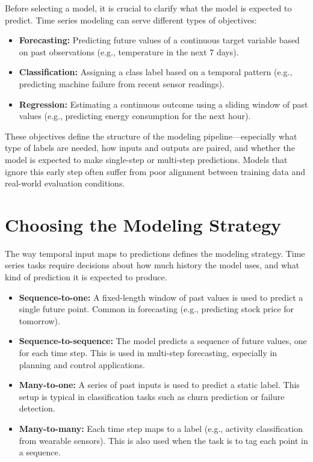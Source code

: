 \documentclass[12pt,openany]{book}
\begin{document}
Before selecting a model, it is crucial to clarify what the model is expected to predict. Time series modeling can serve different types of objectives:

\begin{itemize}
    \item \textbf{Forecasting:} Predicting future values of a continuous target variable based on past observations (e.g., temperature in the next 7 days).
    \item \textbf{Classification:} Assigning a class label based on a temporal pattern (e.g., predicting machine failure from recent sensor readings).
    \item \textbf{Regression:} Estimating a continuous outcome using a sliding window of past values (e.g., predicting energy consumption for the next hour).
\end{itemize}

These objectives define the structure of the modeling pipeline—especially what type of labels are needed, how inputs and outputs are paired, and whether the model is expected to make single-step or multi-step predictions. Models that ignore this early step often suffer from poor alignment between training data and real-world evaluation conditions.


\section{Choosing the Modeling Strategy}

The way temporal input maps to predictions defines the modeling strategy. Time series tasks require decisions about how much history the model uses, and what kind of prediction it is expected to produce.

\begin{itemize}
    \item \textbf{Sequence-to-one:} A fixed-length window of past values is used to predict a single future point. Common in forecasting (e.g., predicting stock price for tomorrow).
    
    \item \textbf{Sequence-to-sequence:} The model predicts a sequence of future values, one for each time step. This is used in multi-step forecasting, especially in planning and control applications.

    \item \textbf{Many-to-one:} A series of past inputs is used to predict a static label. This setup is typical in classification tasks such as churn prediction or failure detection.

    \item \textbf{Many-to-many:} Each time step maps to a label (e.g., activity classification from wearable sensors). This is also used when the task is to tag each point in a sequence.
\end{itemize}
\end{document}
